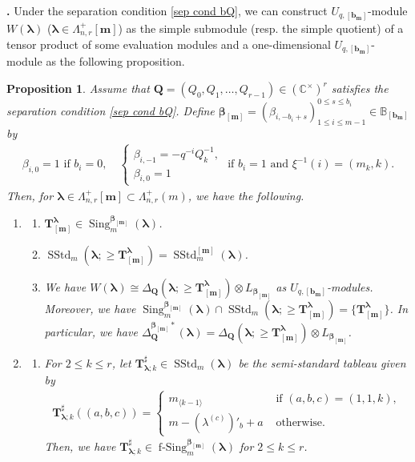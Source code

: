 \documentclass[12pt]{amsart}
\newtheorem{prop}[thm]{Proposition}
\def \para{\refstepcounter{thm} \par\medskip\noindent
                \textbf{\thethm .} }
\numberwithin{equation}{thm}
\newcommand\BB{\mathbb B}
\newcommand\CC{\mathbb C}
\newcommand\bQ{\mathbf Q}
\newcommand\bT{\mathbf T}
\newcommand\bb{\mathbf b}
\renewcommand\bm{\mathbf m} %
\renewcommand\b{\beta}   %
\newcommand\la{\lambda}
\newcommand\D{\Delta}
\newcommand\vL{\varLambda}
\newcommand\Bb{\boldsymbol\beta}
\newcommand\Bla{\boldsymbol\lambda}
\newcommand\lan{\langle}
\newcommand\ran{\rangle}
\newcommand{\SStd}{\operatorname{SStd}}
\newcommand{\Sing}{\operatorname{Sing}}
\newcommand{\fSing}{\operatorname{f-Sing}}
\begin{document}
\para 
Under the separation condition \eqref{sep cond bQ}, 
we can  construct $U_{q,[\bb_{\bm}]}$-module $W(\Bla)$ ($\Bla \in \vL_{n,r}^+[\bm]$) 
as the simple submodule (resp. the simple quotient) of a tensor product of some evaluation modules 
and a one-dimensional $U_{q,[\bb_{\bm}]}$-module 
as the following proposition. 

\begin{prop}
\label{Prop WBla D Bla}
Assume that $\bQ=(Q_0,Q_1,\dots, Q_{r-1}) \in (\CC^{\times})^r$ satisfies the separation condition \eqref{sep cond bQ}. 
Define $\Bb_{[\bm]} =(\b_{i, - b_i +s})^{0 \leq s \leq b_i}_{1 \leq i \leq m-1} \in \BB_{ [ \bb_{\bm}]}$ by 
\begin{align*}
\b_{i,0} =1 \text{ if } b_i=0, 
\quad 
\begin{cases}
\b_{i,-1} = - q^{-i} Q_k^{-1}, 
\\
\b_{i,0} = 1 
\end{cases}
\text{ if } b_i=1 \text{ and } \xi^{-1} (i) =(m_k,k). 
\end{align*}
Then, for $\Bla \in \vL_{n,r}^+[\bm] \subset \vL_{n,r}^+(m)$, we have the following. 

\begin{enumerate}
\item 
\begin{enumerate}
\item 
$\bT^{\Bla}_{[\bm]} \in \Sing_m^{\Bb_{[\bm]}} (\Bla)$. 

\item 
$\SStd_m (\Bla ; \geq \bT_{[\bm]}^{\Bla}) = \SStd_m^{[\bm]}(\Bla)$. 

\item 
We have $W(\Bla) \cong \D_{\bQ}(\Bla ; \geq \bT_{[\bm]}^{\Bla}) \otimes L_{\Bb_{[\bm]}}$ as $U_{q,[\bb_{\bm}]}$-modules. 
Moreover, we have 
$\Sing_m^{\Bb_{[\bm]}}(\Bla) \cap \SStd_m (\Bla ; \geq \bT_{[\bm]}^{\Bla}) =\{\bT_{[\bm]}^{\Bla}\}$. 
In particular, we have  
$\D_{\bQ}^{\Bb_{[\bm]} *} (\Bla) = \D_{\bQ}(\Bla ; \geq \bT_{[\bm]}^{\Bla}) \otimes L_{\Bb_{[\bm]}}$. 
\end{enumerate}

\item 
\begin{enumerate}
\item 
For $2 \leq k \leq r$, 
let $\bT^\sharp_{\Bla;k} \in \SStd_m(\Bla)$ be the semi-standard tableau given by 
\begin{align*}
\bT^{\sharp}_{\Bla ; k} ((a,b,c)) 
	= \begin{cases} 
		m_{\lan k-1 \ran} & \text{ if } (a,b,c)= (1,1,k), 
		\\
		m - (\la^{(c)})'_b +a & \text{ otherwise}.
	\end{cases}
\end{align*}
Then, we have $\bT^{\sharp}_{\Bla;k} \in \fSing_m^{\Bb_{[\bm]}}(\Bla)$ for $2 \leq k \leq r$. 


\end{enumerate}
\end{enumerate}
\end{prop}
\end{document}

